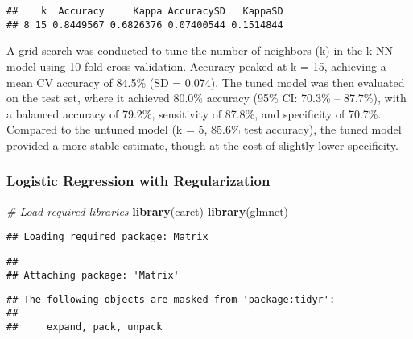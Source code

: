 \documentclass[
]{article}
\newenvironment{Shaded}{\begin{snugshade}}{\end{snugshade}}
\newcommand{\CommentTok}[1]{\textcolor[rgb]{0.56,0.35,0.01}{\textit{#1}}}
\newcommand{\DecValTok}[1]{\textcolor[rgb]{0.00,0.00,0.81}{#1}}
\newcommand{\FunctionTok}[1]{\textcolor[rgb]{0.13,0.29,0.53}{\textbf{#1}}}
\newcommand{\NormalTok}[1]{#1}
\newcommand{\SpecialCharTok}[1]{\textcolor[rgb]{0.81,0.36,0.00}{\textbf{#1}}}
\begin{document}
\begin{Shaded}
\end{Shaded}

\begin{verbatim}
##    k  Accuracy     Kappa AccuracySD   KappaSD
## 8 15 0.8449567 0.6826376 0.07400544 0.1514844
\end{verbatim}

A grid search was conducted to tune the number of neighbors (k) in the
k-NN model using 10-fold cross-validation. Accuracy peaked at k = 15,
achieving a mean CV accuracy of 84.5\% (SD = 0.074). The tuned model was
then evaluated on the test set, where it achieved 80.0\% accuracy (95\%
CI: 70.3\% -- 87.7\%), with a balanced accuracy of 79.2\%, sensitivity
of 87.8\%, and specificity of 70.7\%. Compared to the untuned model (k =
5, 85.6\% test accuracy), the tuned model provided a more stable
estimate, though at the cost of slightly lower specificity.

\subsubsection{Logistic Regression with
Regularization}\label{logistic-regression-with-regularization}

\begin{Shaded}
\begin{Highlighting}[]
\CommentTok{\# Load required libraries}
\FunctionTok{library}\NormalTok{(caret)}
\FunctionTok{library}\NormalTok{(glmnet)}
\end{Highlighting}
\end{Shaded}

\begin{verbatim}
## Loading required package: Matrix
\end{verbatim}

\begin{verbatim}
## 
## Attaching package: 'Matrix'
\end{verbatim}

\begin{verbatim}
## The following objects are masked from 'package:tidyr':
## 
##     expand, pack, unpack
\end{verbatim}
\end{document}
